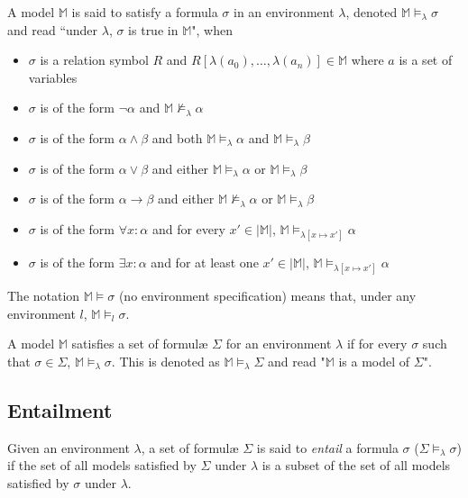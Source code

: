 		A model $\mathbb{M}$ is said to satisfy a formula $\sigma$ in an
		environment $\lambda$, denoted $\mathbb{M} \models_\lambda \sigma$ and
		read ``under $\lambda$, $\sigma$ is true in $\mathbb{M}$", when
		\begin{itemize}
		\item $\sigma$ is a relation symbol $R$ and $R[\lambda(a_0) , \ldots , \lambda(a_n)] \in \mathbb{M}$ where $a$ is a set of variables
		\item $\sigma$ is of the form $\neg\alpha$ and $\mathbb{M} \not\models_\lambda \alpha$
		\item $\sigma$ is of the form $\alpha\wedge\beta$ and both $\mathbb{M} \models_\lambda \alpha$ and $\mathbb{M} \models_\lambda \beta$
		\item $\sigma$ is of the form $\alpha\vee\beta$ and either $\mathbb{M} \models_\lambda \alpha$ or $\mathbb{M} \models_\lambda \beta$
		\item $\sigma$ is of the form $\alpha\to\beta$ and either $\mathbb{M} \not\models_\lambda \alpha$ or $\mathbb{M} \models_\lambda \beta$
		\item $\sigma$ is of the form $\forall x : \alpha$  and for every $x' \in |\mathbb{M}|$, $\mathbb{M} \models_{\lambda[x \mapsto x']} \alpha$
		\item $\sigma$ is of the form $\exists x : \alpha$  and for at least one $x' \in |\mathbb{M}|$, $\mathbb{M} \models_{\lambda[x \mapsto x']} \alpha$
		\end{itemize}
		The notation $\mathbb{M} \models \sigma$ (no environment specification)
		means that, under any environment $l$, $\mathbb{M} \models_l \sigma$.

		A model $\mathbb{M}$ satisfies a set of formul{\ae} $\Sigma$ for an
		environment $\lambda$ if for every $\sigma$ such that $\sigma \in
		\Sigma$, $\mathbb{M} \models_\lambda \sigma$. This is denoted as
		$\mathbb{M} \models_\lambda \Sigma$ and read "$\mathbb{M}$ is a model
		of $\Sigma$".

	\subsection{Entailment}

		Given an environment $\lambda$, a set of formul{\ae} $\Sigma$ is said
		to \emph{entail} a formula $\sigma$ ($\Sigma \models_\lambda \sigma$)
		if the set of all models satisfied by $\Sigma$ under $\lambda$ is a
		subset of the set of all models satisfied by $\sigma$ under $\lambda$.

